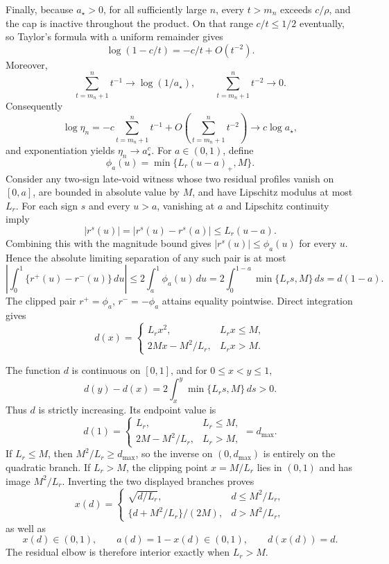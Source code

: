 Finally, because \(a_\star>0\), for all sufficiently large \(n\), every \(t>m_n\) exceeds \(c/\rho\), and the cap is inactive throughout the product.  On that range \(c/t\le1/2\) eventually, so Taylor's formula with a uniform remainder gives
\[
 \log(1-c/t)=-c/t+O(t^{-2}).
\]
Moreover,
\[
 \sum_{t=m_n+1}^n t^{-1}\longrightarrow\log(1/a_\star),
 \qquad
 \sum_{t=m_n+1}^n t^{-2}\longrightarrow0.
\]
Consequently
\[
 \log\eta_n
 =-c\sum_{t=m_n+1}^n t^{-1}
   +O\!\left(\sum_{t=m_n+1}^n t^{-2}\right)
 \longrightarrow c\log a_\star,
\]
and exponentiation yields \(\eta_n\to a_\star^c\).
For \(a\in(0,1)\), define
\[
 \phi_a(u)=\min\{L_r(u-a)_+,M\}.
\]
Consider any two-sign late-void witness whose two residual profiles vanish on \([0,a]\), are bounded in absolute value by \(M\), and have Lipschitz modulus at most \(L_r\).  For each sign \(s\) and every \(u>a\), vanishing at \(a\) and Lipschitz continuity imply
\[
 |r^s(u)|=|r^s(u)-r^s(a)|\le L_r(u-a).
\]
Combining this with the magnitude bound gives \(|r^s(u)|\le\phi_a(u)\) for every \(u\).  Hence the absolute limiting separation of any such pair is at most
\[
 \left|\int_0^1\{r^+(u)-r^-(u)\}\,du\right|
 \le2\int_a^1\phi_a(u)\,du
 =2\int_0^{1-a}\min\{L_rs,M\}\,ds
 =d(1-a).
\]
The clipped pair \(r^+=\phi_a\), \(r^-=-\phi_a\) attains equality pointwise.  Direct integration gives
\[
 d(x)=
 \begin{cases}
 L_rx^2,&L_rx\le M,\\
 2Mx-M^2/L_r,&L_rx>M.
 \end{cases}
\]

The function \(d\) is continuous on \([0,1]\), and for \(0\le x<y\le1\),
\[
 d(y)-d(x)=2\int_x^y\min\{L_rs,M\}\,ds>0.
\]
Thus \(d\) is strictly increasing.  Its endpoint value is
\[
 d(1)=
 \begin{cases}
 L_r,&L_r\le M,\\
 2M-M^2/L_r,&L_r>M,
 \end{cases}
 =d_{\max}.
\]
If \(L_r\le M\), then \(M^2/L_r\ge d_{\max}\), so the inverse on \((0,d_{\max})\) is entirely on the quadratic branch.  If \(L_r>M\), the clipping point \(x=M/L_r\) lies in \((0,1)\) and has image \(M^2/L_r\).  Inverting the two displayed branches proves
\[
 x(d)=
 \begin{cases}
 \sqrt{d/L_r},&d\le M^2/L_r,\\
 \{d+M^2/L_r\}/(2M),&d>M^2/L_r,
 \end{cases}
\]
as well as
\[
 x(d)\in(0,1),
 \qquad a(d)=1-x(d)\in(0,1),
 \qquad d(x(d))=d.
\]
The residual elbow is therefore interior exactly when \(L_r>M\).

